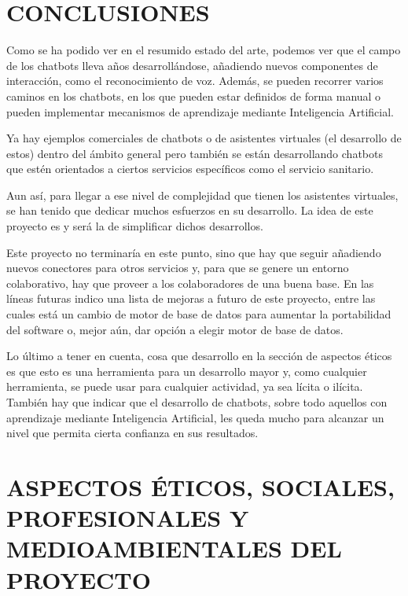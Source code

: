 \documentclass[spanish,12pt, a4paper, twoside]{paper}
\let\oldsection\section
\def\section{\cleardoublepage\oldsection}
\begin{document}
\section{CONCLUSIONES}

Como se ha podido ver en el resumido estado del arte, podemos ver que el campo de los chatbots lleva años desarrollándose, añadiendo nuevos componentes de interacción, como el reconocimiento de voz. Además, se pueden recorrer varios caminos en los chatbots, en los que pueden estar definidos de forma manual o pueden implementar mecanismos de aprendizaje mediante Inteligencia Artificial.
\newline

Ya hay ejemplos comerciales de chatbots o de asistentes virtuales (el desarrollo de estos) dentro del ámbito general pero también se están desarrollando chatbots que estén orientados a ciertos servicios específicos como el servicio sanitario.
\newline

Aun así, para llegar a ese nivel de complejidad que tienen los asistentes virtuales, se han tenido que dedicar muchos esfuerzos en su desarrollo. La idea de este proyecto es y será la de simplificar dichos desarrollos.
\newline

Este proyecto no terminaría en este punto, sino que hay que seguir añadiendo nuevos conectores para otros servicios y, para que se genere un entorno colaborativo, hay que proveer a los colaboradores de una buena base. En las líneas futuras indico una lista de mejoras a futuro de este proyecto, entre las cuales está un cambio de motor de base de datos para aumentar la portabilidad del software o, mejor aún, dar opción a elegir motor de base de datos.
\newline

Lo último a tener en cuenta, cosa que desarrollo en la sección de aspectos éticos es que esto es una herramienta para un desarrollo mayor y, como cualquier herramienta, se puede usar para cualquier actividad, ya sea lícita o ilícita. También hay que indicar que el desarrollo de chatbots, sobre todo aquellos con aprendizaje mediante Inteligencia Artificial, les queda mucho para alcanzar un nivel que permita cierta confianza en sus resultados.

\section{ASPECTOS ÉTICOS, SOCIALES, PROFESIONALES Y MEDIOAMBIENTALES DEL PROYECTO}
\end{document}
